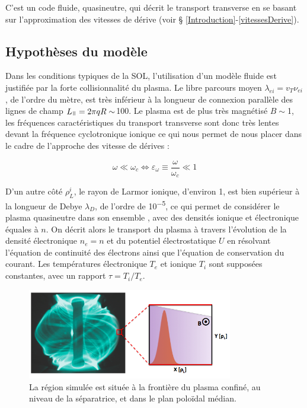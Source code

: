 \begin{refsection}
C'est un code fluide, quasineutre, qui décrit le transport transverse en se
basant sur l'approximation des vitesses de dérive (voir §
\ref{Introduction}-\ref{vitessesDerive}).

\subsection{Hypothèses du modèle}
Dans les conditions typiques de la SOL, l'utilisation d'un modèle fluide est
justifiée par la forte collisionnalité du plasma. Le libre parcours moyen
$\lambda_{ei}=v_T \nu_{ei}$, de l'ordre du mètre, est très inférieur à la
longueur de connexion parallèle des lignes de champ $L_\para=2\pi q R\sim
$\unit{100}{\meter}.
Le plasma est de plus très magnétisé $B\sim$\unit{1}{\tesla}, les fréquences
caractéristiques du transport transverse sont donc très lentes devant la fréquence
cyclotronique ionique ce qui nous permet de nous placer dans le cadre de
l'approche des vitesse de dérives :

\begin{equation}
\omega\ll\omega_c\Leftrightarrow \varepsilon_\omega\equiv\frac{\omega}{\omega_c}\ll 1
\end{equation}

D'un autre côté $\rho_L^i$, le rayon de Larmor ionique, d'environ
\unit{1}{\milli\meter}, est bien supérieur à la longueur de
Debye $\lambda_D$, de l'ordre de \unit{10^{-5}}{\meter}, ce qui permet de
considérer le plasma quasineutre dans son ensemble
, avec des densités ionique et électronique équales à $n$.
On décrit alors le transport du plasma à travers l'évolution de la densité
électronique $n_e=n$ et du potentiel électrostatique $U$ en résolvant l'équation
de continuité des électrons ainsi que l'équation de conservation du courant. Les
températures électronique
$T_e$ et ionique $T_i$ sont supposées constantes, avec un rapport $\tau=T_i/T_e$.
\begin{figure}[htbp]
\centering
    \includegraphics[width=0.8\textwidth]{figures/2-tokamSimDomain.png}
    \caption{La région simulée est située à la frontière du plasma confiné,
    au niveau de la séparatrice, et dans le plan poloïdal médian.}
    \label{2-figTokamGeom}
\end{figure}


\end{refsection}
